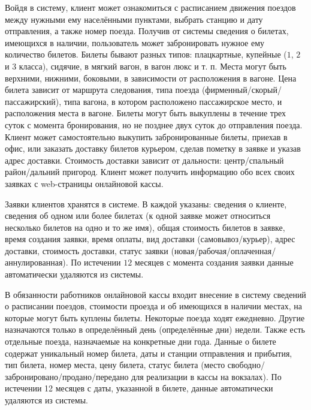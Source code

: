 \documentclass[11pt,a4paper,twoside,listtotoc,bibtotoc]{report}
\numberwithin{equation}{section}
\theoremstyle{definition}
\theoremstyle{plain}
\begin{document}
Войдя в систему, клиент может ознакомиться с расписанием движения
поездов между нужными ему населёнными пунктами, выбрать станцию и
дату отправления, а также номер поезда. Получив от системы сведения
о билетах, имеющихся в наличии, пользователь может забронировать
нужное ему количество билетов. Билеты бывают разных типов: плацкартные,
купейные ($1$, $2$ и $3$ класса), сидячие, в мягкий вагон, в вагон люкс
и т. п. Места могут быть верхними, нижними, боковыми, в зависимости от
расположения в вагоне. Цена билета зависит от маршрута следования,
типа поезда (фирменный/скорый/пассажирский), типа вагона, в котором расположено
пассажирское место, и расположения места в вагоне. Билеты могут быть
выкуплены в течение трех суток с момента бронирования, но не позднее
двух суток до отправления поезда. Клиент может самостоятельно выкупить
забронированные билеты, приехав в офис, или заказать доставку билетов курьером,
сделав пометку в заявке и указав адрес доставки. Стоимость доставки зависит от
дальности: центр/спальный район/дальний пригород. Клиент может получить
информацию обо всех своих заявках с web-страницы онлайновой кассы.

Заявки клиентов хранятся в системе. В каждой указаны: сведения о клиенте,
сведения об одном или более билетах (к одной заявке может относиться
несколько билетов на одно и то же имя), общая стоимость билетов в
заявке, время создания заявки, время оплаты, вид доставки
(самовывоз/курьер), адрес доставки, стоимость доставки, статус заявки
(новая/рабочая/оплаченная/аннулированная). По истечении $12$ месяцев с
момента создания заявки данные автоматически удаляются из системы.

В обязанности работников онлайновой кассы входит внесение в систему сведений
о расписании поездов, стоимости проезда и об имеющихся в наличии местах, на
которые могут быть куплены билеты. Некоторые поезда ходят ежедневно. Другие
назначаются только в определённый день (определённые дни) недели. Также есть
отдельные поезда, назначаемые на конкретные дни года. Данные о билете содержат
уникальный номер билета, даты и станции отправления и прибытия, тип билета,
номер места, цену билета, статус билета
(место свободно/забронировано/продано/передано для реализации в кассы на вокзалах).
По истечении 12 месяцев
с даты, указанной в билете, данные автоматически удаляются из системы.
\end{document}
